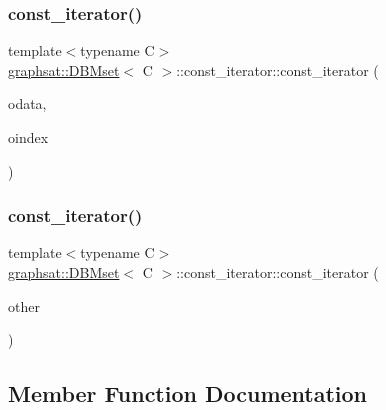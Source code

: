 \subsubsection{\texorpdfstring{const\_iterator()}{const\_iterator()}\hspace{0.1cm}{\footnotesize\ttfamily [2/3]}}
{\footnotesize\ttfamily template$<$typename C$>$ \\
\mbox{\hyperlink{classgraphsat_1_1_d_b_mset}{graphsat\+::\+D\+B\+Mset}}$<$ C $>$\+::const\+\_\+iterator\+::const\+\_\+iterator (\begin{DoxyParamCaption}\item[{const \mbox{\hyperlink{classgraphsat_1_1_d_b_mset}{D\+B\+Mset}}$<$ C $>$ $\ast$}]{odata,  }\item[{size\+\_\+t}]{oindex }\end{DoxyParamCaption})\hspace{0.3cm}{\ttfamily [inline]}}

\mbox{\label{classgraphsat_1_1_d_b_mset_1_1const__iterator_a0d6c9b46deafd694547a4b047a9fe371}} 
\subsubsection{\texorpdfstring{const\_iterator()}{const\_iterator()}\hspace{0.1cm}{\footnotesize\ttfamily [3/3]}}
{\footnotesize\ttfamily template$<$typename C$>$ \\
\mbox{\hyperlink{classgraphsat_1_1_d_b_mset}{graphsat\+::\+D\+B\+Mset}}$<$ C $>$\+::const\+\_\+iterator\+::const\+\_\+iterator (\begin{DoxyParamCaption}\item[{const \mbox{\hyperlink{classgraphsat_1_1_d_b_mset_1_1const__iterator}{const\+\_\+iterator}} \&}]{other }\end{DoxyParamCaption})\hspace{0.3cm}{\ttfamily [inline]}}



\subsection{Member Function Documentation}
\mbox{\label{classgraphsat_1_1_d_b_mset_1_1const__iterator_acbf30d7be409b9b4806fd0594eaf95be}} 
